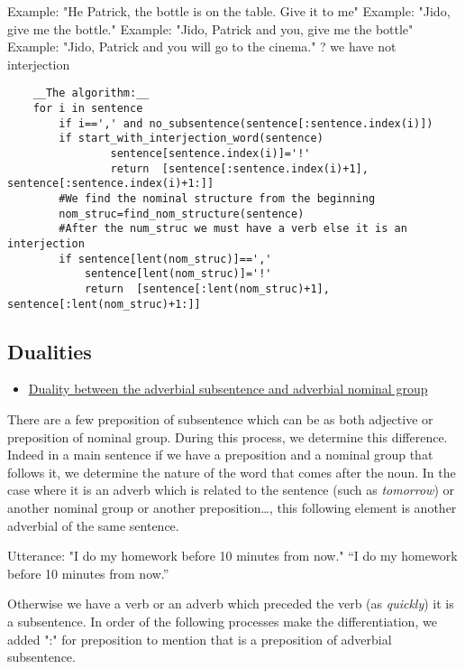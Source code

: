 \documentclass[twoside,a4paper,10pt]{report}
\begin{document}
\small
\begin{verbatimtab}
  Example: "He Patrick, the bottle is on the table. Give it to me"
  Example: "Jido, give me the bottle." 
  Example: "Jido, Patrick and you, give me the bottle"
  Example: "Jido, Patrick and you will go to the cinema." ? we have not interjection
\end{verbatimtab}
\normalsize

\lstset{language=python}
\begin{lstlisting}
    __The algorithm:__
    for i in sentence
        if i==',' and no_subsentence(sentence[:sentence.index(i)])
	    if start_with_interjection_word(sentence)
                sentence[sentence.index(i)]='!'
                return  [sentence[:sentence.index(i)+1], sentence[:sentence.index(i)+1:]]
        #We find the nominal structure from the beginning
        nom_struc=find_nom_structure(sentence)
        #After the num_struc we must have a verb else it is an interjection
        if sentence[lent(nom_struc)]==','
            sentence[lent(nom_struc)]='!'
            return  [sentence[:lent(nom_struc)+1], sentence[:lent(nom_struc)+1:]]

\end{lstlisting}

\subsection{Dualities}
\label{ceb3780718f195cca0227bdf527d4a06}%

\begin{itemize}
    \item  \underline{Duality between the adverbial subsentence and adverbial nominal group}
\end{itemize}
There are a few preposition of subsentence which can be as both adjective or preposition of nominal group. During this process, we determine this difference. Indeed in a main sentence if we have a preposition and a nominal group that follows it, we determine the nature of the word that comes after the noun. In the case where it is an adverb which is related to the sentence (such as \textsl{tomorrow}) or another nominal group or another preposition…, this following element is another adverbial of the same sentence. 


\small
\begin{verbatimtab}
  Utterance: "I do my homework before 10 minutes from now."
  “I do my homework before 10 minutes from now.”
\end{verbatimtab}
\normalsize
Otherwise we have a verb or an adverb which preceded the verb (as \textsl{quickly}) it is a subsentence. In order of the following processes make the differentiation, we added ":" for preposition to mention that is a preposition of adverbial subsentence.
\end{document}
